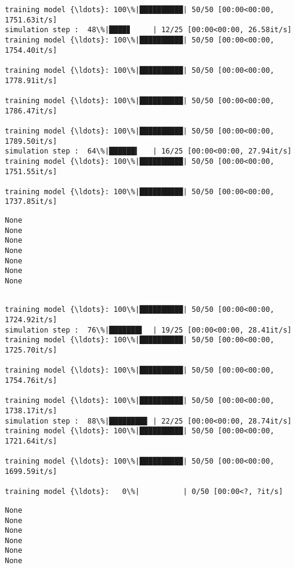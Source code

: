 \documentclass[11pt]{article}
\begin{document}
    \begin{Verbatim}[commandchars=\\\{\}]
training model {\ldots}: 100\%|██████████| 50/50 [00:00<00:00, 1751.63it/s]
simulation step :  48\%|████▊     | 12/25 [00:00<00:00, 26.58it/s]
training model {\ldots}: 100\%|██████████| 50/50 [00:00<00:00, 1754.40it/s]

training model {\ldots}: 100\%|██████████| 50/50 [00:00<00:00, 1778.91it/s]

training model {\ldots}: 100\%|██████████| 50/50 [00:00<00:00, 1786.47it/s]

training model {\ldots}: 100\%|██████████| 50/50 [00:00<00:00, 1789.50it/s]
simulation step :  64\%|██████▍   | 16/25 [00:00<00:00, 27.94it/s]
training model {\ldots}: 100\%|██████████| 50/50 [00:00<00:00, 1751.55it/s]

training model {\ldots}: 100\%|██████████| 50/50 [00:00<00:00, 1737.85it/s]
    \end{Verbatim}

    \begin{Verbatim}[commandchars=\\\{\}]
None
None
None
None
None
None
None
    \end{Verbatim}

    \begin{Verbatim}[commandchars=\\\{\}]

training model {\ldots}: 100\%|██████████| 50/50 [00:00<00:00, 1724.92it/s]
simulation step :  76\%|███████▌  | 19/25 [00:00<00:00, 28.41it/s]
training model {\ldots}: 100\%|██████████| 50/50 [00:00<00:00, 1725.70it/s]

training model {\ldots}: 100\%|██████████| 50/50 [00:00<00:00, 1754.76it/s]

training model {\ldots}: 100\%|██████████| 50/50 [00:00<00:00, 1738.17it/s]
simulation step :  88\%|████████▊ | 22/25 [00:00<00:00, 28.74it/s]
training model {\ldots}: 100\%|██████████| 50/50 [00:00<00:00, 1721.64it/s]

training model {\ldots}: 100\%|██████████| 50/50 [00:00<00:00, 1699.59it/s]

training model {\ldots}:   0\%|          | 0/50 [00:00<?, ?it/s]
    \end{Verbatim}

    \begin{Verbatim}[commandchars=\\\{\}]
None
None
None
None
None
None
    \end{Verbatim}
\end{document}
